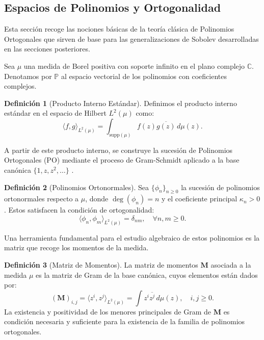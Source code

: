 \documentclass[12pt,a4paper]{article}
\theoremstyle{definition}
\newtheorem{definition}{Definición}
\theoremstyle{remark}
\begin{document}
\subsection{Espacios de Polinomios y Ortogonalidad}

Esta sección recoge las nociones básicas de la teoría clásica de Polinomios Ortogonales que sirven de base para las generalizaciones de Sobolev desarrolladas en las secciones posteriores.

Sea $\mu$ una medida de Borel positiva con soporte infinito en el plano complejo $\mathbb{C}$. Denotamos por $\mathbb{P}$ al espacio vectorial de los polinomios con coeficientes complejos.

\begin{definition}[Producto Interno Estándar] \label{def:producto_estandar}
  Definimos el producto interno estándar en el espacio de Hilbert $L^2(\mu)$ como:
  \begin{equation}
    \langle f, g \rangle_{L^2(\mu)} = \int_{\text{supp}(\mu)} f(z) \overline{g(z)} \, d\mu(z).
  \end{equation}
\end{definition}

A partir de este producto interno, se construye la sucesión de Polinomios Ortogonales (PO) mediante el proceso de Gram-Schmidt aplicado a la base canónica $\{1, z, z^2, \dots\}$ \cite{szego1975orthogonal}.

\begin{definition}[Polinomios Ortonormales] \label{def:polinomios_ortonormales}
  Sea $\{\phi_n\}_{n \geq 0}$ la sucesión de polinomios ortonormales respecto a $\mu$, donde $\deg(\phi_n) = n$ y el coeficiente principal $\kappa_n > 0$. Estos satisfacen la condición de ortogonalidad:
  \begin{equation}
    \langle \phi_n, \phi_m \rangle_{L^2(\mu)} = \delta_{nm}, \quad \forall n,m \geq 0.
  \end{equation}
\end{definition}

Una herramienta fundamental para el estudio algebraico de estos polinomios es la matriz que recoge los momentos de la medida.

\begin{definition}[Matriz de Momentos] \label{def:matriz_momentos}
  La matriz de momentos $\mathbf{M}$ asociada a la medida $\mu$ es la matriz de Gram de la base canónica, cuyos elementos están dados por:
  \begin{equation}
    (\mathbf{M})_{i,j} = \langle z^i, z^j \rangle_{L^2(\mu)} = \int z^i \overline{z^j} \, d\mu(z), \quad i,j \geq 0.
  \end{equation}
  La existencia y positividad de los menores principales de Gram de $\mathbf{M}$ es condición necesaria y suficiente para la existencia de la familia de polinomios ortogonales.
\end{definition}
\end{document}
